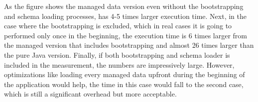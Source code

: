 As the figure shows the managed data version even without the bootstrapping and schema loading processes, has 4-5 times larger execution time.
Next, in the case where the bootstrapping is excluded, which in real cases it is going to performed only once in the beginning, the execution time is 6 times larger from the managed version that includes bootstrapping and almost 26 times larger than the pure Java version.
Finally, if both bootstrapping and schema loader is included in the measurement, the numbers are impressively large. 
However, optimizations like loading every managed data upfront during the beginning of the application would help, the time in this case would fall to the second case, which is still a significant overhead but more acceptable.